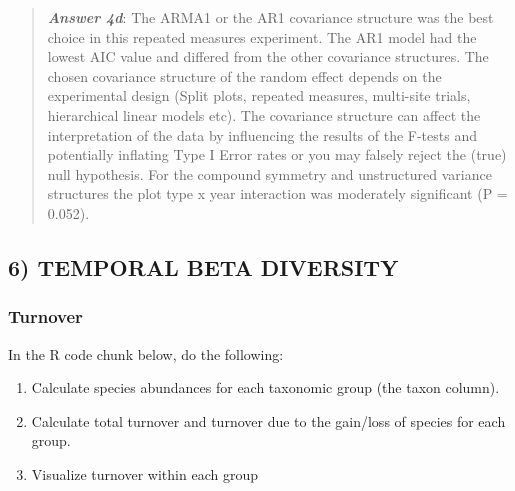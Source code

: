 \documentclass[]{article}
\providecommand{\tightlist}{%
  \setlength{\itemsep}{0pt}\setlength{\parskip}{0pt}}
\begin{document}
\begin{quote}
\textbf{\emph{Answer 4d}}: The ARMA1 or the AR1 covariance structure was
the best choice in this repeated measures experiment. The AR1 model had
the lowest AIC value and differed from the other covariance structures.
The chosen covariance structure of the random effect depends on the
experimental design (Split plots, repeated measures, multi-site trials,
hierarchical linear models etc). The covariance structure can affect the
interpretation of the data by influencing the results of the F-tests and
potentially inflating Type I Error rates or you may falsely reject the
(true) null hypothesis. For the compound symmetry and unstructured
variance structures the plot type x year interaction was moderately
significant (P = 0.052).
\end{quote}

\subsection{6) TEMPORAL BETA DIVERSITY}\label{temporal-beta-diversity}

\subsubsection{Turnover}\label{turnover}

In the R code chunk below, do the following:

\begin{enumerate}
\def\labelenumi{\arabic{enumi}.}
\tightlist
\item
  Calculate species abundances for each taxonomic group (the taxon
  column).
\item
  Calculate total turnover and turnover due to the gain/loss of species
  for each group.
\item
  Visualize turnover within each group
\end{enumerate}
\end{document}
